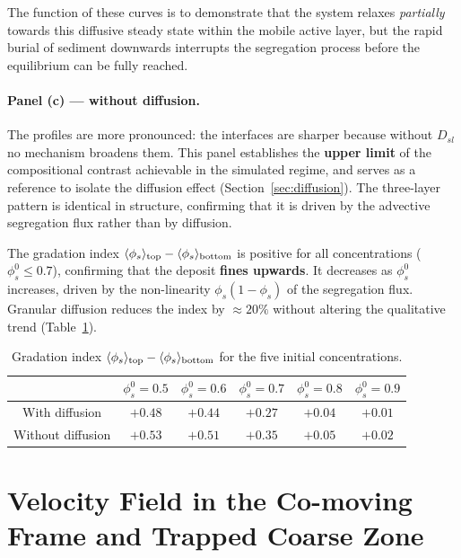 \documentclass[12pt, a4paper]{article}
\begin{document}
The function of these curves is to demonstrate that the system relaxes \textit{partially} towards this diffusive steady state within the mobile active layer, but the rapid burial of sediment downwards interrupts the segregation process before the equilibrium can be fully reached.

\paragraph{Panel (c) --- without diffusion.}
The profiles are more pronounced: the interfaces are sharper because
without $D_{sl}$ no mechanism broadens them. This panel establishes the
\textbf{upper limit} of the compositional contrast achievable in the simulated
regime, and serves as a reference to isolate the diffusion effect
(Section~\ref{sec:diffusion}). The three-layer pattern is identical in
structure, confirming that it is driven by the advective segregation flux
rather than by diffusion.

The gradation index $\langle\phi_s\rangle_{\rm top} - \langle\phi_s\rangle_{\rm bottom}$
is positive for all concentrations ($\phi_s^0 \leq 0.7$), confirming that the
deposit \textbf{fines upwards}. It decreases as $\phi_s^0$ increases, driven
by the non-linearity $\phi_s(1-\phi_s)$ of the segregation flux.
Granular diffusion reduces the index by $\approx 20\%$ without altering the
qualitative trend (Table~\ref{tab:gradation}).

\begin{table}[H]
    \centering
    \begin{tabular}{cccccc}
        \toprule
        & $\phi_s^0 = 0.5$ & $\phi_s^0 = 0.6$ & $\phi_s^0 = 0.7$
        & $\phi_s^0 = 0.8$ & $\phi_s^0 = 0.9$ \\
        \midrule
        With diffusion    & $+0.48$ & $+0.44$ & $+0.27$ & $+0.04$ & $+0.01$ \\
        Without diffusion & $+0.53$ & $+0.51$ & $+0.35$ & $+0.05$ & $+0.02$ \\
        \bottomrule
    \end{tabular}
    \caption{Gradation index
             $\langle\phi_s\rangle_{\rm top} - \langle\phi_s\rangle_{\rm bottom}$
             for the five initial concentrations.}
    \label{tab:gradation}
\end{table}

\newpage
\section{Velocity Field in the Co-moving Frame and Trapped Coarse Zone}
\label{sec:velocity}
\end{document}
